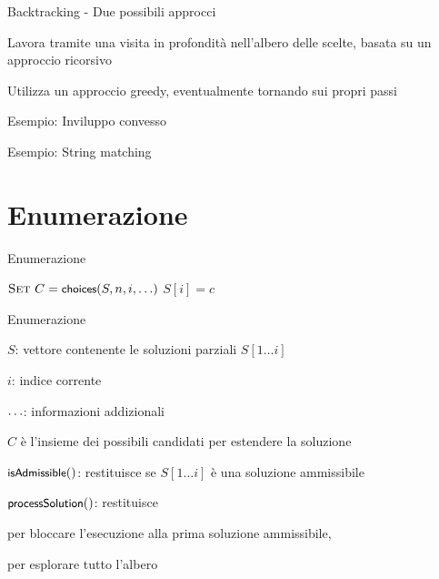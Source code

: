 \begin{frame}{Backtracking - Due possibili approcci}

\vspace{-9pt}
\begin{myboxtitle}[Ricorsivo]
\BIL
\item Lavora tramite una visita in profondità nell'albero delle scelte, basata su un approccio ricorsivo
\EIL
\end{myboxtitle}


\begin{myboxtitle}[Iterativo]
\BIL
\item Utilizza un approccio greedy, eventualmente tornando sui propri passi
\item Esempio: \alert{Inviluppo convesso}
\item Esempio: \alert{String matching}
\EIL
\end{myboxtitle}

\end{frame}

\section{Enumerazione}


\begin{frame}{Enumerazione}

\vspace{-9pt}
\begin{Procedure}
\caption[A]{\BOOLEAN\ \enumerazione($\Item[\,]\ S$, \INTEGER $n$, \INTEGER\ $i$, \mldots)}
$\textsc{Set}\ C = \textsf{{\small choices}}(S, n, i, \ldots)$\;
{
  $S[i] = c$\;
  {
  }
}
\Return \FALSE\;
\end{Procedure}

\end{frame}

\begin{frame}{Enumerazione}

\BIL
\item $S$: vettore contenente le soluzioni parziali $S[1 \ldots i]$
\item $i$: indice corrente
\item $\ldots$: informazioni addizionali
\item $C$ è l'insieme dei possibili candidati per estendere la soluzione
\item $\textsf{{\small isAdmissible}}()$: restituisce \TRUE se $S[1 \ldots i]$ è una soluzione ammissibile
\item $\textsf{{\small processSolution}}()$: restituisce 
\BI
\item \TRUE per bloccare l'esecuzione alla prima 
soluzione ammissibile, 
\item \FALSE per esplorare tutto l'albero
\EI
\EIL

\end{frame}

